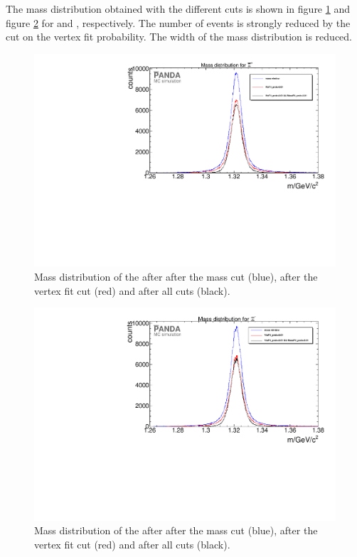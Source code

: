 		The mass distribution obtained with the different cuts is shown in figure \ref{fig:XiPlus_massdiffcuts} and figure \ref{fig:XiMinus_massdiffcuts} 
		for \anticascade and \cascade, respectively.
		The number of events is strongly reduced by the cut on the vertex fit probability. 
		The width of the mass distribution is reduced. 
		
		\begin{figure}
			\centering
				\includegraphics[width=1.1\textwidth]{./plots/Xi/XiPlus_m_diffcuts.pdf}
			\caption{\propose Mass distribution of the \anticascade after after the mass cut (blue), after the vertex fit cut (red) and after all cuts (black).}
			\label{fig:XiPlus_massdiffcuts}
		\end{figure}
		
		\begin{figure}
			\centering		
				\includegraphics[width=1.1\textwidth]{./plots/Xi/XiMinus_m_diffcuts.pdf}
			\caption{\propose Mass distribution of the \cascade after after the mass cut (blue), after the vertex fit cut (red) and after all cuts (black).}
			\label{fig:XiMinus_massdiffcuts}
		\end{figure}
		
